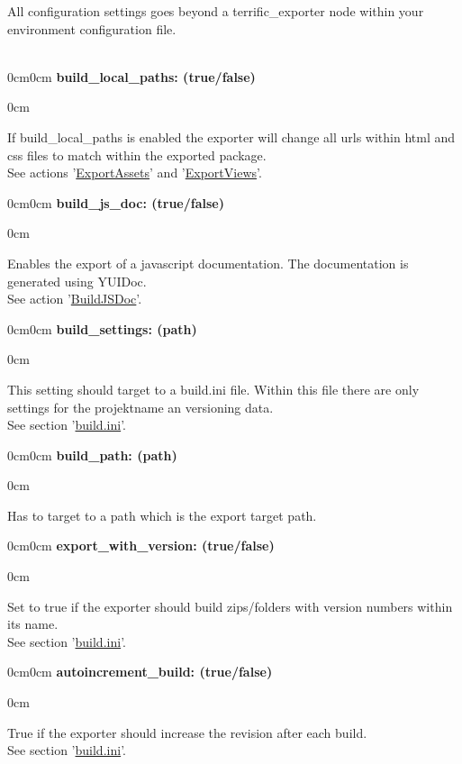 
\newcommand{\optiondesc}[2]{
	\begin{adjustwidth}{0cm}{0cm}
		\noindent \textbf{#1}\\
		\vspace{-1em}
		\begin{adjustwidth}{\parindent}{0cm}
			#2
		\end{adjustwidth}
	\end{adjustwidth}
}

All configuration settings goes beyond a terrific\_exporter node within your environment configuration file.\\
\\
\optiondesc{build\_local\_paths: (true/false)}{
	If build\_local\_paths is enabled the exporter will change all urls within html and css files to match within the exported package.
	\\See actions '\hyperlink{sec-Actions-ExportAssets}{ExportAssets}' and '\hyperlink{sec-Actions-ExportViews}{ExportViews}'.\\
}

\optiondesc{build\_js\_doc: (true/false)}{
	Enables the export of a javascript documentation. The documentation is generated using YUIDoc.
	\\See action '\hyperlink{sec-Actions-BuildJSDoc}{BuildJSDoc}'.\\
}

\optiondesc{build\_settings: (path)}{
	This setting should target to a build.ini file. Within this file there are only settings for the projektname an versioning data.
	\\See section '\hyperlink{sec-build.ini}{build.ini}'.\\
}

\optiondesc{build\_path: (path)}{
	Has to target to a path which is the export target path.\\
}

\optiondesc{export\_with\_version: (true/false)}{
	Set to true if the exporter should build zips/folders with version numbers within its name.
	\\See section '\hyperlink{sec-build.ini}{build.ini}'.\\
}

\optiondesc{autoincrement\_build: (true/false)}{
	True if the exporter should increase the revision after each build.
	\\See section '\hyperlink{sec-build.ini}{build.ini}'.\\
}

